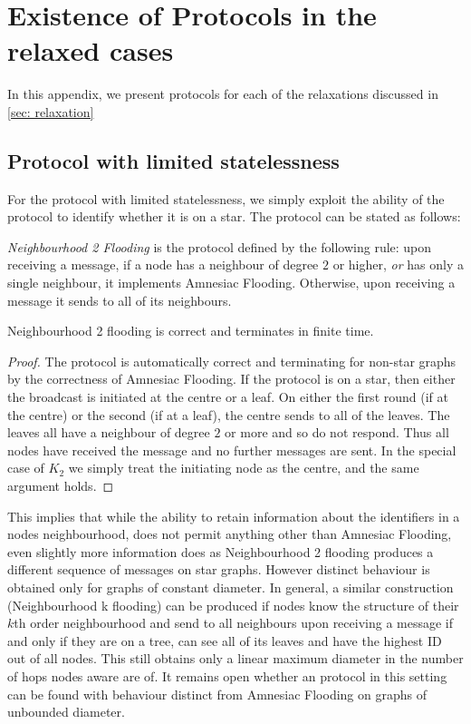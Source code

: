 \section{ Existence of Protocols in the relaxed cases}
\label{apx: relaxed}
In this appendix, we present protocols for each of the relaxations discussed in \cref{sec: relaxation}
\subsection{Protocol with limited statelessness}
For the protocol with limited statelessness, we simply exploit the ability of the protocol to identify whether it is on a star.
The protocol can be stated as follows:
\begin{definition}
    \emph{Neighbourhood 2 Flooding} is the protocol defined by the following rule:
    upon receiving a message, if a node has a neighbour of degree $2$ or higher, \emph{or} has only a single neighbour, it implements Amnesiac Flooding.
    Otherwise, upon receiving a message it sends to all of its neighbours.
\end{definition}
\begin{proposition}
    Neighbourhood 2 flooding is correct and terminates in finite time.
\end{proposition}
\begin{proof}
    The protocol is automatically correct and terminating for non-star graphs by the correctness of Amnesiac Flooding.
    If the protocol is on a star, then either the broadcast is initiated at the centre or a leaf.
    On either the first round (if at the centre) or the second (if at a leaf), the centre sends to all of the leaves.
    The leaves all have a neighbour of degree $2$ or more and so do not respond.
    Thus all nodes have received the message and no further messages are sent.
    In the special case of $K_2$ we simply treat the initiating node as the centre, and the same argument holds.
\end{proof}
This implies that while the ability to retain information about the identifiers in a nodes neighbourhood, does not permit anything other than Amnesiac Flooding, even slightly more information does as Neighbourhood 2 flooding produces a different sequence of messages on star graphs.
However distinct behaviour is obtained only for graphs of constant diameter.
In general, a similar construction (Neighbourhood k flooding) can be produced if nodes know the structure of their $k$th order neighbourhood and send to all neighbours upon receiving a message if and only if they are on a tree, can see all of its leaves and have the highest ID out of all nodes.
This still obtains only a linear maximum diameter in the number of hops nodes aware are of.
It remains open whether an protocol in this setting can be found with behaviour distinct from Amnesiac Flooding on graphs of unbounded diameter.
